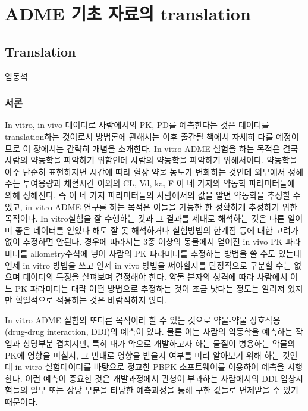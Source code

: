\documentclass[
  11pt,
  krantz2, a4paper, twoside]{krantz}
\begin{document}
\hypertarget{part-adme-uxae30uxcd08-uxc790uxb8ccuxc758-translation}{%
\part{ADME 기초 자료의 translation}\label{part-adme-uxae30uxcd08-uxc790uxb8ccuxc758-translation}}

\hypertarget{translation}{%
\chapter{Translation}\label{translation}}

\Large\hfill

임동석
\normalsize

\hypertarget{uxc11cuxb860-6}{%
\section{서론}\label{uxc11cuxb860-6}}

In vitro, in vivo 데이터로 사람에서의 PK, PD를 예측한다는 것은 데이터를 translation하는 것이로서 방법론에 관해서는 이후 출간될 책에서 자세히 다룰 예정이므로 이 장에서는 간략히 개념을 소개한다.
In vitro ADME 실험을 하는 목적은 결국 사람의 약동학을 파악하기 위함인데 사람의 약동학을 파악하기 위해서이다.
약동학을 아주 단순히 표현하자면 시간에 따라 혈장 약물 농도가 변화하는 것인데 외부에서 정해주는 투여용량과 채혈시간 이외의 CL, Vd, ka, F 이 네 가지의 약동학 파라미터들에 의해 정해진다.
즉 이 네 가지 파라미터들의 사람에서의 값을 알면 약동학을 추정할 수 있고, in vitro ADME 연구를 하는 목적은 이들을 가능한 한 정확하게 추정하기 위한 목적이다.
In vitro실험을 잘 수행하는 것과 그 결과를 제대로 해석하는 것은 다른 일이며 좋은 데이터를 얻었다 해도 잘 못 해석하거나 실험방법의 한계점 등에 대한 고려가 없이 추정하면 안된다.
경우에 따라서는 3종 이상의 동물에서 얻어진 in vivo PK 파라미터를 allometry수식에 넣어 사람의 PK 파라미터를 추정하는 방법을 쓸 수도 있는데 언제 in vitro 방법을 쓰고 언제 in vivo 방법을 써야할지를 단정적으로 구분할 수는 없으며 데이터의 특징을 살펴보며 결정해야 한다.
약물 분자의 성격에 따라 사람에서 어느 PK 파라미터는 대략 어떤 방법으로 추정하는 것이 조금 낫다는 정도는 알려져 있지만 획일적으로 적용하는 것은 바람직하지 않다.

In vitro ADME 실험의 또다른 목적이라 할 수 있는 것으로 약물-약물 상호작용 (drug-drug interaction, DDI)의 예측이 있다.
물론 이는 사람의 약동학을 예측하는 작업과 상당부분 겹치지만, 특히 내가 약으로 개발하고자 하는 물질이 병용하는 약물의 PK에 영향을 미칠지, 그 반대로 영향을 받을지 여부를 미리 알아보기 위해 하는 것인데 in vitro 실험데이터를 바탕으로 정교한 PBPK 소프트웨어를 이용하여 예측을 시행한다.
이런 예측이 중요한 것은 개발과정에서 관청이 부과하는 사람에서의 DDI 임상시험들의 일부 또는 상당 부분을 타당한 예측과정을 통해 구한 값들로 면제받을 수 있기 때문이다.
\end{document}
